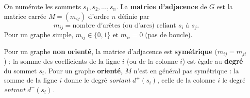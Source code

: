 \begin{definition}
On numérote les sommets $s_1,s_2,\dots,s_n$. La \textbf{matrice d'adjacence} de $G$ est la
matrice carrée $M=(m_{ij})$ d'ordre $n$ définie par
\[
m_{ij}=\text{nombre d'arêtes (ou d'arcs) reliant } s_i \text{ à } s_j.
\]
Pour un graphe simple, $m_{ij}\in\{0,1\}$ et $m_{ii}=0$ (pas de boucle).
\end{definition}

\begin{propriete}
Pour un graphe \textbf{non orienté}, la matrice d'adjacence est \textbf{symétrique}
($m_{ij}=m_{ji}$) ; la somme des coefficients de la ligne $i$ (ou de la colonne $i$) est
égale au \textbf{degré} du sommet $s_i$. Pour un graphe \textbf{orienté}, $M$ n'est en
général pas symétrique : la somme de la ligne $i$ donne le degré \emph{sortant} $d^{+}(s_i)$,
celle de la colonne $i$ le degré \emph{entrant} $d^{-}(s_i)$.
\end{propriete}

\begin{illus}
\end{illus}

